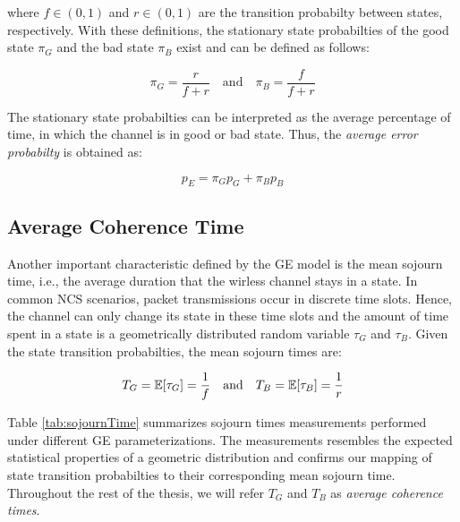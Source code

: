 where $f\in(0,1)$ and $r\in(0,1)$ are the transition probabilty between states,
respectively. With these definitions, the stationary state probabilties of the
good state $\pi_G$ and the bad state $\pi_B$ exist and can be defined as
follows:

\begin{equation}
  \pi_G = \frac{r}{f+r} \quad \textrm{and} \quad \pi_B = \frac{f}{f+r}
\end{equation}

The stationary state probabilties can be interpreted as the average percentage
of time, in which the channel is in good or bad state. Thus, the \textit{average
error probabilty} is obtained as:

\begin{equation}
  p_E = \pi_G p_G + \pi_B p_B
  \label{eq:avgLoss}
\end{equation}

\subsection*{Average Coherence Time}
Another important characteristic defined by the GE model is the mean sojourn
time, i.e., the average duration that the wirless channel stays in a state. In
common NCS scenarios, packet transmissions occur in discrete time slots. Hence,
the channel can only change its state in these time slots and the amount of time
spent in a state is a geometrically distributed random variable $\tau_G$ and
$\tau_B$. Given the state transition probabilties, the mean sojourn times are:

\begin{equation}
  T_G = \mathbb{E}[\tau_G] = \frac{1}{f} \quad \textrm{and} \quad T_B = \mathbb{E}[\tau_B] = \frac{1}{r}
\end{equation}

Table \ref{tab:sojournTime} summarizes sojourn times measurements performed
under different GE parameterizations. The measurements resembles the expected
statistical properties of a geometric distribution and confirms our mapping of
state transition probabilties to their corresponding mean sojourn time.
Throughout the rest of the thesis, we will refer $T_G$ and $T_B$ as
\textit{average coherence times}.

